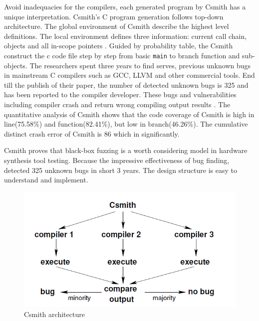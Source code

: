 Avoid inadequacies for the compilers, each generated program by Csmith has a unique interpretation. Csmith's C program generation follows top-down architecture. The global environment of Csmith describe the highest level definitions. The local environment defines three information: current call chain, objects and all in-scope pointers \cite{Yang:2011:FUB:1993316.1993532}. Guided by probability table, the Csmith construct the c code file step by step from basic \texttt{main} to branch function and sub-objects. The researchers spent three years to find serves, previous unknown bugs in mainstream C compilers such as GCC, LLVM and other commercial tools. End till the publish of their paper, the number of detected unknown bugs is 325 and has been reported to the compiler developer. These bugs and vulnerabilities including compiler crash and return wrong compiling output results \cite{klees2018evaluating}. The quantitative analysis of Csmith shows that the code coverage of Csmith is high in line(75.58\%) and function(82.41\%), but low in branch(46.26\%). The cumulative distinct crash error of Csmith is 86 which in significantly.

Csmith proves that black-box fuzzing is a worth considering model in hardware synthesis tool testing. Because the impressive effectiveness of bug finding, detected 325 unknown bugs in short 3 years. The design structure is easy to understand and implement.

\begin{figure}[htbp]
\centering
\includegraphics[scale=0.6]{MScThesisTemplate/Figs/Csmith.PNG}
\caption{Csmith architecture \cite{Yang:2011:FUB:1993316.1993532}}
\label{Fig:csmith}
\end{figure}

